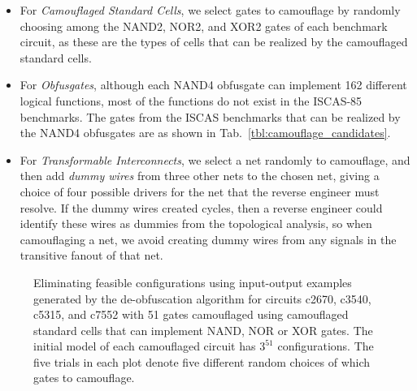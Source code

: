 \documentclass[proposal]{umassthesis}  %
\begin{document}
\begin{itemize}

\item For \textit{Camouflaged Standard Cells}, we select {gates to camouflage by randomly choosing among the } NAND2, NOR2, and XOR2 gates of each benchmark circuit, as these are the types of cells that can be realized by the camouflaged standard cells.

\item For \textit{Obfusgates}, although each NAND4 obfusgate can implement 162 different logical functions, most of the functions do not exist in the ISCAS-85 benchmarks. The gates from the ISCAS benchmarks that can be realized by the NAND4 obfusgates are as shown in Tab.~\ref{tbl:camouflage_candidates}.

\item For \textit{Transformable Interconnects}, we select a net randomly to camouflage, and then add \textit{dummy wires} from three other nets to the chosen net, giving a choice of four possible drivers for the net that the reverse engineer must resolve. If the dummy wires created cycles, then a reverse engineer could identify these wires as dummies from the topological analysis, so when camouflaging a net, we avoid creating dummy wires from any signals in the transitive fanout of that net. 

\end{itemize}


\begin{figure}[!hbt]
  \centering
  {
        \vspace{-2mm}
    
    }
    \vspace{-2mm}
    
    \caption{Eliminating feasible configurations using input-output examples generated by the de-obfuscation algorithm for circuits c2670, c3540, c5315, and c7552 with 51 gates camouflaged using camouflaged standard cells that can implement NAND, NOR or XOR gates. The initial model of each camouflaged circuit has $3^{51}$ configurations. The five trials in each plot denote five different random choices of which gates to camouflage.}
    \vspace{-2mm}
    \label{fig:c7552_coverage}
\end{figure}
\end{document}
